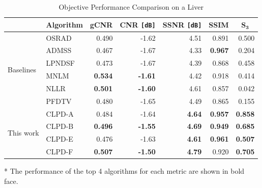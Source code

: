 \begin{table}
  \centering
  \caption{Objective Performance Comparison on a Liver}
  \begin{threeparttable}
  \begin{tabular}{llrrrrr}
    \toprule
    & \multicolumn{1}{c}{\textbf{Algorithm}}
    & \multicolumn{1}{c}{\textbf{gCNR}}
    & \multicolumn{1}{c}{\textbf{CNR} \texttt{[dB]}}
    & \multicolumn{1}{c}{\textbf{SSNR} \texttt{[dB]}}
    & \multicolumn{1}{c}{\textbf{SSIM}}
    & \multicolumn{1}{c}{\(\mathbf{S_{3}}\)} \\\midrule
    \multirow{6}{*}{Baselines}
    & OSRAD  & 0.490          & -1.62          & 4.51          & 0.891          & 0.500 \\
    & ADMSS  & 0.467          & -1.67          & 4.33          & \textbf{0.967} & 0.204 \\
    & LPNDSF & 0.473          & -1.67          & 4.39          & 0.868          & 0.458 \\
    & MNLM   & \textbf{0.534} & \textbf{-1.61} & 4.42          & 0.918          & 0.414 \\
    & NLLR   & \textbf{0.501} & \textbf{-1.60} & 4.61          & 0.857          & 0.042\\
    & PFDTV  & 0.480          & -1.65          & 4.49          & 0.865          & 0.155 \\\midrule
    \multirow{4}{*}{This work}
    & CLPD-A & 0.484          & -1.64          & \textbf{4.64} & \textbf{0.957} & \textbf{0.858} \\
    & CLPD-B & \textbf{0.496} & \textbf{-1.55} & \textbf{4.69} & \textbf{0.949} & \textbf{0.685} \\
    & CLPD-E & 0.476          & -1.63          & \textbf{4.61} & \textbf{0.961} & \textbf{0.507} \\
    & CLPD-F & \textbf{0.507} & \textbf{-1.50} & \textbf{4.79} & 0.920          & \textbf{0.705} \\\bottomrule
  \end{tabular}
  \begin{tablenotes}
    \item[*] The performance of the top 4 algorithms for each metric are shown in bold face.
  \end{tablenotes}
  \end{threeparttable}
\end{table}






